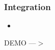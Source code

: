 \begin{frame}
\frametitle{Integration}

\begin{itemize}
				
\item
	
		
\end{itemize}
\end{frame}

\begin{frame}

\Huge{\centerline{DEMO ---$ > $}}

\end{frame}